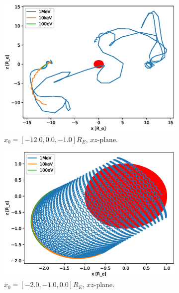 \begin{figure}
\begin{subfigure}[h]{0.45\textwidth}
        \includegraphics[width=\textwidth]{Figures/Trajectories/trajectories-xz-43.eps}
        \caption{$x_0 = [-12.0,0.0,-1.0]R_E$, $xz$-plane.}
        \label{fig:traj-e}
    \end{subfigure}
    \hfill
    \begin{subfigure}[h]{0.45\textwidth}
        \includegraphics[width=\textwidth]{Figures/Trajectories/trajectories-xz-11.eps}
        \caption{$x_0 = [-2.0,-1.0,0.0]R_E$, $xz$-plane.}
        \label{fig:traj-f}
    \end{subfigure}
    \vfill
    \begin{subfigure}[h]{0.45\textwidth}

\end{subfigure}
\end{figure}
